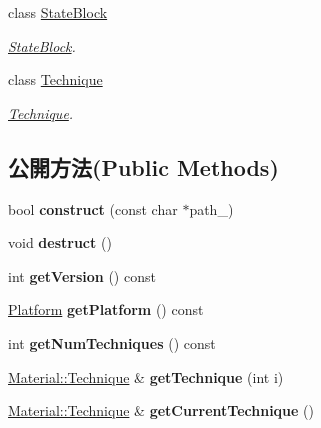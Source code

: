 \begin{DoxyCompactItemize}
class \hyperlink{class_i_dream_sky_1_1_material_1_1_state_block}{State\+Block}
\begin{DoxyCompactList}\small\item\em \hyperlink{class_i_dream_sky_1_1_material_1_1_state_block}{State\+Block}. \end{DoxyCompactList}\item 
class \hyperlink{class_i_dream_sky_1_1_material_1_1_technique}{Technique}
\begin{DoxyCompactList}\small\item\em \hyperlink{class_i_dream_sky_1_1_material_1_1_technique}{Technique}. \end{DoxyCompactList}\end{DoxyCompactItemize}
\subsection*{公開方法(Public Methods)}
\begin{DoxyCompactItemize}
\item 
bool {\bfseries construct} (const char $\ast$path\+\_\+)\hypertarget{class_i_dream_sky_1_1_material_a68761ba4f4298e8f3bd7a9a84e24eb32}{}\label{class_i_dream_sky_1_1_material_a68761ba4f4298e8f3bd7a9a84e24eb32}

\item 
void {\bfseries destruct} ()\hypertarget{class_i_dream_sky_1_1_material_a6e088d94c4822926821eee26de4d6ff6}{}\label{class_i_dream_sky_1_1_material_a6e088d94c4822926821eee26de4d6ff6}

\item 
int {\bfseries get\+Version} () const \hypertarget{class_i_dream_sky_1_1_material_a6e6304a6b45be279b3cc078d396c347d}{}\label{class_i_dream_sky_1_1_material_a6e6304a6b45be279b3cc078d396c347d}

\item 
\hyperlink{class_i_dream_sky_1_1_platform}{Platform} {\bfseries get\+Platform} () const \hypertarget{class_i_dream_sky_1_1_material_afb9f1bf9e737cafd5ff65c668fd8ce13}{}\label{class_i_dream_sky_1_1_material_afb9f1bf9e737cafd5ff65c668fd8ce13}

\item 
int {\bfseries get\+Num\+Techniques} () const \hypertarget{class_i_dream_sky_1_1_material_a5a6402d3ceb58b46dfdab6693642addc}{}\label{class_i_dream_sky_1_1_material_a5a6402d3ceb58b46dfdab6693642addc}

\item 
\hyperlink{class_i_dream_sky_1_1_material_1_1_technique}{Material\+::\+Technique} \& {\bfseries get\+Technique} (int i)\hypertarget{class_i_dream_sky_1_1_material_a6d8d5671d038ff7a3b0385f28aeb384d}{}\label{class_i_dream_sky_1_1_material_a6d8d5671d038ff7a3b0385f28aeb384d}

\item 
\hyperlink{class_i_dream_sky_1_1_material_1_1_technique}{Material\+::\+Technique} \& {\bfseries get\+Current\+Technique} ()\hypertarget{class_i_dream_sky_1_1_material_afd6262f343c74ce6c4e3af67e4e58ddb}{}\label{class_i_dream_sky_1_1_material_afd6262f343c74ce6c4e3af67e4e58ddb}

\end{DoxyCompactItemize}


